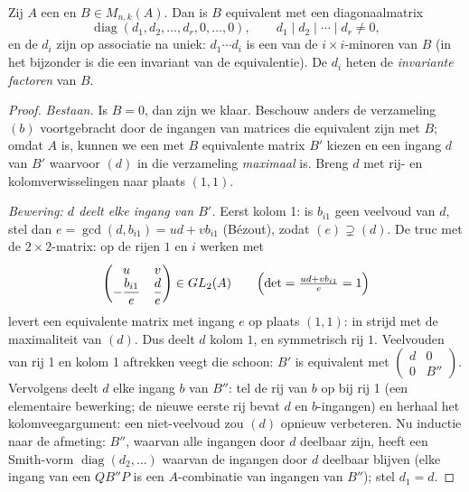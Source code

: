 \begin{theorem}\label{thm:b3:modules:smith}
Zij $A$ een  en $B \in M_{n,k}(A)$. Dan is $B$
equivalent met een diagonaalmatrix
\[
\operatorname{diag}(d_1, d_2, \dots, d_r, 0, \dots, 0),
\qquad d_1 \mid d_2 \mid \cdots \mid d_r \neq 0 ,
\]
en de $d_i$ zijn op associatie na uniek: $d_1 \cdots d_i$ is een
 van de $i \times i$-minoren van $B$ (in het
bijzonder is die  een invariant van de
equivalentie). De $d_i$ heten de \emph{invariante
factoren} van $B$.
\end{theorem}

\begin{proof}
\emph{Bestaan.} Is $B = 0$, dan zijn we klaar. Beschouw anders de
verzameling  $(b)$ voortgebracht door de ingangen van
matrices die equivalent zijn met $B$; omdat $A$  is, kunnen
we een met $B$ equivalente matrix $B'$ kiezen en een ingang $d$
van $B'$ waarvoor $(d)$ in die verzameling \emph{maximaal} is.
Breng $d$ met rij- en kolomverwisselingen naar plaats $(1,1)$.

\emph{Bewering: $d$ deelt elke ingang van $B'$.} Eerst kolom 1: is
$b_{i1}$ geen veelvoud van $d$, stel dan $e = \gcd(d, b_{i1}) = ud
+ vb_{i1}$ (Bézout), zodat $(e) \supsetneq (d)$. De truc met de $2
\times 2$-matrix: op de rijen $1$ en $i$ werken met
\[
\begin{pmatrix} u & v \\ -\dfrac{b_{i1}}e & \dfrac de
\end{pmatrix}
\in GL_2(A)
\qquad
\Bigl(\det = \tfrac{ud + v b_{i1}}e = 1\Bigr)
\]
levert een equivalente matrix met ingang $e$ op plaats $(1,1)$: in
strijd met de maximaliteit van $(d)$. Dus deelt $d$ kolom $1$, en
symmetrisch rij $1$. Veelvouden van rij 1 en kolom 1 aftrekken
veegt die schoon: $B'$ is equivalent met $\begin{pmatrix} d & 0\\
0 & B''\end{pmatrix}$. Vervolgens deelt $d$ elke ingang $b$ van
$B''$: tel de rij van $b$ op bij rij 1 (een elementaire bewerking;
de nieuwe eerste rij bevat $d$ en $b$-ingangen) en herhaal het
kolomveegargument: een niet-veelvoud zou $(d)$ opnieuw
verbeteren. Nu inductie naar de afmeting: $B''$, waarvan alle
ingangen door $d$ deelbaar zijn, heeft een Smith-vorm
$\operatorname{diag}(d_2, \dots)$ waarvan de ingangen door $d$
deelbaar blijven (elke ingang van een $QB''P$ is een
$A$-combinatie van ingangen van $B''$); stel $d_1 = d$.


\end{proof}
